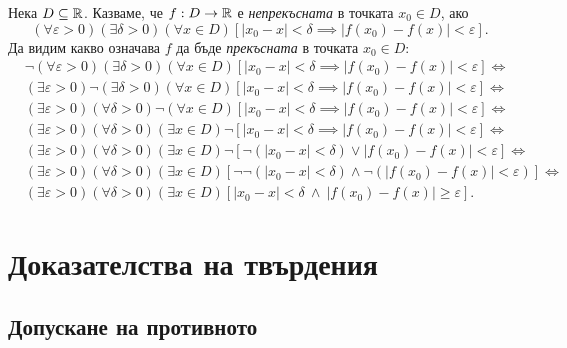 \begin{example}
  Нека $D \subseteq \mathbb{R}$.
  Казваме, че $f:D \to \mathbb{R}$ е {\em непрекъсната} в точката $x_0 \in D$, ако 
  \[(\forall \varepsilon > 0)(\exists \delta >0)(\forall x\in D)[|x_0 - x| < \delta \implies |f(x_0) - f(x)| < \varepsilon].\]
  Да видим какво означава $f$ да бъде {\em прекъсната} в точката $x_0 \in D$:
  \begin{align*}
    & \neg (\forall \varepsilon > 0)(\exists \delta >0)(\forall x\in D)[|x_0 - x| < \delta \implies |f(x_0) - f(x)| < \varepsilon] \iff\\
    & (\exists \varepsilon > 0) \neg (\exists \delta >0)(\forall x\in D)[|x_0 - x| < \delta \implies |f(x_0) - f(x)| < \varepsilon] \iff \\
    & (\exists \varepsilon > 0)(\forall \delta >0)\neg(\forall x\in D)[|x_0 - x| < \delta \implies |f(x_0) - f(x)| < \varepsilon] \iff \\
    & (\exists \varepsilon > 0)(\forall \delta >0)(\exists x\in D)\neg[|x_0 - x| < \delta \implies |f(x_0) - f(x)| < \varepsilon] \iff \\
    & (\exists \varepsilon > 0)(\forall \delta >0)(\exists x\in D)\neg[\neg (|x_0 - x| <\delta) \vee |f(x_0) - f(x)| < \varepsilon] \iff \\
    & (\exists \varepsilon > 0)(\forall \delta >0)(\exists x\in D)[\neg\neg (|x_0 - x| <\delta) \land \neg (|f(x_0) - f(x)| < \varepsilon)] \iff \\
    & (\exists \varepsilon > 0)(\forall \delta >0)(\exists x\in D)[|x_0 - x| < \delta\ \land\ |f(x_0) - f(x)| \geq \varepsilon].
  \end{align*}
\end{example}

\section{Доказателства на твърдения}

\subsection*{Допускане на противното}

